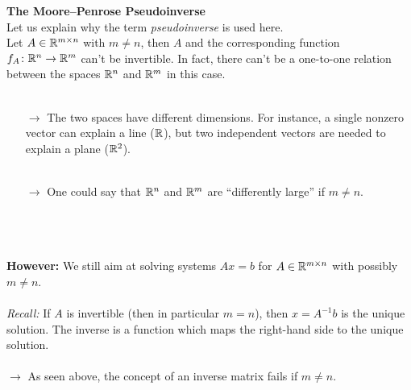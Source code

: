 \begin{frame}
	\textbf{\large The Moore--Penrose Pseudoinverse}
	~\\
	Let us explain why the term \textit{pseudoinverse} is used here.~\\
	Let $A \in {\mathbb{R}}^{m\times n}$ with $m\neq n$, then $A$ and the corresponding function $f_A \colon {\mathbb{R}}^{n} \to {\mathbb{R}}^{m}$ can't be invertible. In fact, there can't be a one-to-one relation between the spaces ${\mathbb{R}}^{n}$ and ${\mathbb{R}}^{m}$ in this case.\\~\\
\begin{itemize}
	\item[$\rightarrow$] The two spaces have different dimensions. For instance, a single nonzero vector can explain a line (${\mathbb{R}}$), but two independent vectors are needed to explain a plane (${\mathbb{R}}^2$).\\~\\
	\item[$\rightarrow$] One could say that ${\mathbb{R}}^{n}$ and ${\mathbb{R}}^{m}$ are ``differently large'' if $m \neq n$.
\end{itemize}
	~\\~\\~\\
	\textbf{\color{header}However:} We still aim at solving systems $Ax = b$ for $A \in {\mathbb{R}}^{m\times n}$ with possibly $m\neq n$.\\~\\
	\textit{Recall:} If $A$ is invertible (then in particular $m=n$), then $x = A^{-1}b$ is the unique solution. The inverse is a function which maps the right-hand side to the unique solution.\\~\\
	$\rightarrow$ As seen above, the concept of an inverse matrix fails if $m\neq n$.\\~\\~\\
\end{frame}

